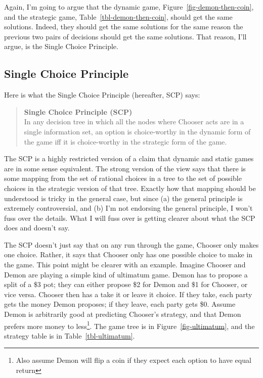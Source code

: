 \documentclass[
  10pt,
  letterpaper,
  DIV=11,
  numbers=noendperiod,
  twoside]{scrartcl}
\begin{document}
Again, I'm going to argue that the dynamic game,
Figure~\ref{fig-demon-then-coin}, and the strategic game,
Table~\ref{tbl-demon-then-coin}, should get the same solutions. Indeed,
they should get the same solutions for the same reason the previous two
pairs of decisions should get the same solutions. That reason, I'll
argue, is the Single Choice Principle.

\subsection{Single Choice Principle}\label{sec-scp-definition}

Here is what the Single Choice Principle (hereafter, SCP) says:

\begin{quote}
\textbf{Single Choice Principle (SCP)}\\
In any decision tree in which all the nodes where Chooser acts are in a
single information set, an option is choice-worthy in the dynamic form
of the game iff it is choice-worthy in the strategic form of the game.
\end{quote}

The SCP is a highly restricted version of a claim that dynamic and
static games are in some sense equivalent. The strong version of the
view says that there is some mapping from the set of rational choices in
a tree to the set of possible choices in the strategic version of that
tree. Exactly how that mapping should be understood is tricky in the
general case, but since (a) the general principle is extremely
controversial, and (b) I'm not endorsing the general principle, I won't
fuss over the details. What I will fuss over is getting clearer about
what the SCP does and doesn't say.

The SCP doesn't just say that on any run through the game, Chooser only
makes one choice. Rather, it says that Chooser only has one possible
choice to make in the game. This point might be clearer with an example.
Imagine Chooser and Demon are playing a simple kind of ultimatum game.
Demon has to propose a split of a \$3 pot; they can either propose \$2
for Demon and \$1 for Chooser, or vice versa. Chooser then has a take it
or leave it choice. If they take, each party gets the money Demon
proposes; if they leave, each party gets \$0. Assume Demon is
arbitrarily good at predicting Chooser's strategy, and that Demon
prefers more money to less\footnote{Also assume Demon will flip a coin
  if they expect each option to have equal return}. The game tree is in
Figure~\ref{fig-ultimatum}, and the strategy table is in
Table~\ref{tbl-ultimatum}.
\end{document}
